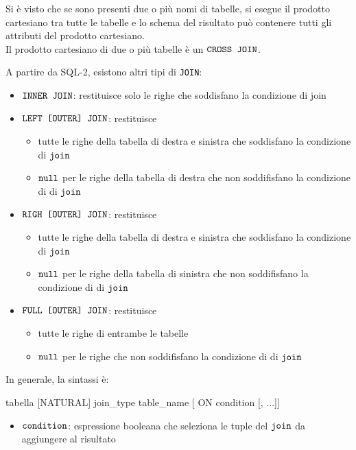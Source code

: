 Si è visto che se sono presenti due o più nomi di tabelle, si esegue il prodotto cartesiano tra tutte le tabelle e lo schema del risultato
può contenere tutti gli attributi del prodotto cartesiano.\\[0.2ex]
Il prodotto cartesiano di due o più tabelle è un $\verb|CROSS JOIN|$.

\medskip
A partire da SQL-2, esistono altri tipi di \texttt{JOIN}:
\begin{itemize}[label=$\circ$, itemsep=\medskipamount]
  \item $\verb|INNER JOIN|$: restituisce solo le righe che soddisfano la condizione di join
  \item $\verb|LEFT [OUTER] JOIN|$: restituisce
  \begin{itemize}[label=$\diamond$, itemsep=\smallskipamount]
    \item tutte le righe della tabella di destra e sinistra che soddisfano la condizione di $\verb|join|$
    \item $\verb|null|$ per le righe della tabella di destra che non soddifisfano la condizione di di $\verb|join|$
  \end{itemize}
  \item $\verb|RIGH [OUTER] JOIN|$: restituisce
  \begin{itemize}[label=$\diamond$, itemsep=\smallskipamount]
    \item tutte le righe della tabella di destra e sinistra che soddisfano la condizione di $\verb|join|$
    \item $\verb|null|$ per le righe della tabella di sinistra che non soddifisfano la condizione di di $\verb|join|$
  \end{itemize}
  \item $\verb|FULL [OUTER] JOIN|$: restituisce
  \begin{itemize}[label=$\diamond$, itemsep=\smallskipamount]
    \item tutte le righe di entrambe le tabelle
    \item $\verb|null|$ per le righe che non soddifisfano la condizione di di $\verb|join|$
  \end{itemize}
\end{itemize}

In generale, la sintassi è:
\begin{sqlcode}
  tabella [NATURAL] join_type table_name [ ON condition [, ...]]
\end{sqlcode}

\begin{itemize}[label=$\triangleright$]
  \item $\verb|condition|$: espressione booleana che seleziona le tuple del $\verb|join|$ da aggiungere al risultato
\end{itemize}

